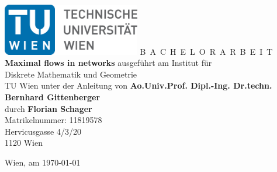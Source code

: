 

\begin{titlepage}
  \begin{center}
    \includegraphics[width=0.45\textwidth]{TULogo.eps}
    \vskip 1cm%
    {\LARGE B~\Large A~C~H~E~L~O~R~A~R~B~E~I~T}
    \vskip 8mm
    {\huge\bfseries Maximal flows in networks}
    \vskip 1cm
    \large 
    ausgef\"uhrt am    
    \vskip 0.75cm
    {\Large Institut f\"ur\\[1ex] Diskrete Mathematik und Geometrie}\\[1ex]
    {\Large TU Wien}
    \vskip0.75cm
    unter der Anleitung von
    \vskip0.75cm
    {\Large\bfseries Ao.Univ.Prof. Dipl.-Ing. Dr.techn. Bernhard Gittenberger}\\[1ex]
    \vskip 0.5cm
    durch
    \vskip 0.5cm
    {\Large\bfseries Florian Schager}\\[1ex]
    Matrikelnummer: {11819578}\\[1ex]
    {Hervicusgasse 4/3/20}\\[1ex]
    {1120 Wien}
  \end{center}
  
  \vfill
  
  \small
  Wien, am \today %
  \vspace*{-15mm}
\end{titlepage}

\cleardoublepage